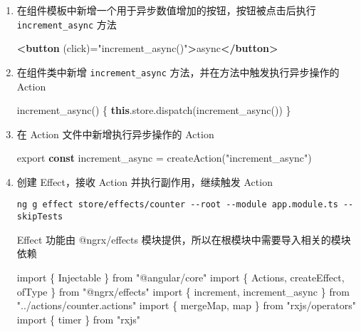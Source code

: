 \documentclass[
]{article}
\newenvironment{Shaded}{}{}
\newcommand{\AttributeTok}[1]{\textcolor[rgb]{0.49,0.56,0.16}{#1}}
\newcommand{\FunctionTok}[1]{\textcolor[rgb]{0.02,0.16,0.49}{#1}}
\newcommand{\ImportTok}[1]{#1}
\newcommand{\KeywordTok}[1]{\textcolor[rgb]{0.00,0.44,0.13}{\textbf{#1}}}
\newcommand{\NormalTok}[1]{#1}
\newcommand{\OperatorTok}[1]{\textcolor[rgb]{0.40,0.40,0.40}{#1}}
\newcommand{\OtherTok}[1]{\textcolor[rgb]{0.00,0.44,0.13}{#1}}
\newcommand{\StringTok}[1]{\textcolor[rgb]{0.25,0.44,0.63}{#1}}
\begin{document}
\begin{enumerate}
\def\labelenumi{\arabic{enumi}.}
\item
  在组件模板中新增一个用于异步数值增加的按钮，按钮被点击后执行
  \texttt{increment\_async} 方法

\begin{Shaded}
\begin{Highlighting}[]
\KeywordTok{\textless{}button}\OtherTok{ (click)=}\StringTok{"increment\_async()"}\KeywordTok{\textgreater{}}\NormalTok{async}\KeywordTok{\textless{}/button\textgreater{}}
\end{Highlighting}
\end{Shaded}
\item
  在组件类中新增 \texttt{increment\_async}
  方法，并在方法中触发执行异步操作的 Action

\begin{Shaded}
\begin{Highlighting}[]
\FunctionTok{increment\_async}\NormalTok{() \{}
  \KeywordTok{this}\OperatorTok{.}\AttributeTok{store}\OperatorTok{.}\FunctionTok{dispatch}\NormalTok{(}\FunctionTok{increment\_async}\NormalTok{())}
\NormalTok{\}}
\end{Highlighting}
\end{Shaded}
\item
  在 Action 文件中新增执行异步操作的 Action

\begin{Shaded}
\begin{Highlighting}[]
\ImportTok{export} \KeywordTok{const}\NormalTok{ increment\_async }\OperatorTok{=} \FunctionTok{createAction}\NormalTok{(}\StringTok{"increment\_async"}\NormalTok{)}
\end{Highlighting}
\end{Shaded}
\item
  创建 Effect，接收 Action 并执行副作用，继续触发 Action

  \texttt{ng\ g\ effect\ store/effects/counter\ -\/-root\ -\/-module\ app.module.ts\ -\/-skipTests}

  Effect 功能由 @ngrx/effects
  模块提供，所以在根模块中需要导入相关的模块依赖

\begin{Shaded}
\begin{Highlighting}[]
\ImportTok{import}\NormalTok{ \{ Injectable \} }\ImportTok{from} \StringTok{"@angular/core"}
\ImportTok{import}\NormalTok{ \{ Actions}\OperatorTok{,}\NormalTok{ createEffect}\OperatorTok{,}\NormalTok{ ofType \} }\ImportTok{from} \StringTok{"@ngrx/effects"}
\ImportTok{import}\NormalTok{ \{ increment}\OperatorTok{,}\NormalTok{ increment\_async \} }\ImportTok{from} \StringTok{"../actions/counter.actions"}
\ImportTok{import}\NormalTok{ \{ mergeMap}\OperatorTok{,}\NormalTok{ map \} }\ImportTok{from} \StringTok{"rxjs/operators"}
\ImportTok{import}\NormalTok{ \{ timer \} }\ImportTok{from} \StringTok{"rxjs"}


\end{Highlighting}
\end{Shaded}
\end{enumerate}
\end{document}
